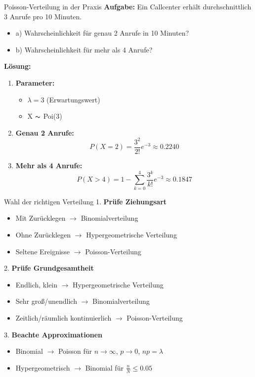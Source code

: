 \begin{example2}{Poisson-Verteilung in der Praxis}
\textbf{Aufgabe:} Ein Callcenter erhält durchschnittlich 3 Anrufe pro 10 Minuten.
\begin{itemize}
\item a) Wahrscheinlichkeit für genau 2 Anrufe in 10 Minuten?
\item b) Wahrscheinlichkeit für mehr als 4 Anrufe?
\end{itemize}

\textbf{Lösung:}
\begin{enumerate}
\item \textbf{Parameter:}
   \begin{itemize}
   \item $\lambda = 3$ (Erwartungswert)
   \item X $\thicksim$ Poi(3)
   \end{itemize}

\item \textbf{Genau 2 Anrufe:}
   $$P(X=2) = \frac{3^2}{2!}e^{-3} \approx 0.2240$$

\item \textbf{Mehr als 4 Anrufe:}
   $$P(X>4) = 1 - \sum_{k=0}^4 \frac{3^k}{k!}e^{-3} \approx 0.1847$$
\end{enumerate}
\end{example2}

\begin{KR}{Wahl der richtigen Verteilung}
1. \textbf{Prüfe Ziehungsart}
   \begin{itemize}
   \item Mit Zurücklegen $\rightarrow$ Binomialverteilung
   \item Ohne Zurücklegen $\rightarrow$ Hypergeometrische Verteilung
   \item Seltene Ereignisse $\rightarrow$ Poisson-Verteilung
   \end{itemize}

2. \textbf{Prüfe Grundgesamtheit}
   \begin{itemize}
   \item Endlich, klein $\rightarrow$ Hypergeometrische Verteilung
   \item Sehr groß/unendlich $\rightarrow$ Binomialverteilung
   \item Zeitlich/räumlich kontinuierlich $\rightarrow$ Poisson-Verteilung
   \end{itemize}

3. \textbf{Beachte Approximationen}
   \begin{itemize}
   \item Binomial $\rightarrow$ Poisson für $n \to \infty$, $p \to 0$, $np = \lambda$
   \item Hypergeometrisch $\rightarrow$ Binomial für $\frac{n}{N} \leq 0.05$
   \end{itemize}
\end{KR}





